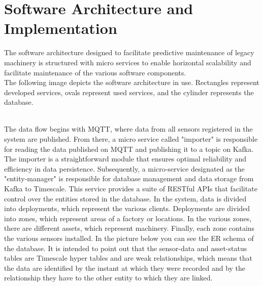 \section{Software Architecture and Implementation}
The software architecture designed to facilitate predictive maintenance of legacy machinery is structured with micro services to enable horizontal scalability and facilitate maintenance of the various software components.
\\The following image depicts the software architecture in use. Rectangles represent developed services, ovals represent used services, and the cylinder represents the database.
\begin{figure}[h!]
    	\centerline{}
\end{figure}
\\The data flow begins with MQTT, where data from all sensors registered in the system are published. From there, a micro service called "importer" is responsible for reading the data published on MQTT and publishing it to a topic on Kafka. The importer is a straightforward module that ensures optimal reliability and efficiency in data persistence. Subsequently, a micro-service designated as the "entity-manager" is responsible for database management and data storage from Kafka to Timescale. This service provides a suite of RESTful APIs that facilitate control over the entities stored in the database. In the system, data is divided into deployments, which represent the various clients. Deployments are divided into zones, which represent areas of a factory or locations. In the various zones, there are different assets, which represent machinery. Finally, each zone contains the various sensors installed. In the picture below you can see the ER schema of the database. It is intended to point out that the sensor-data and asset-status tables are Timescale hyper tables and are weak relationships, which means that the data are identified by the instant at which they were recorded and by the relationship they have to the other entity to which they are linked.
	\begin{figure}[h!]
    	\centerline{}
  	\end{figure}

